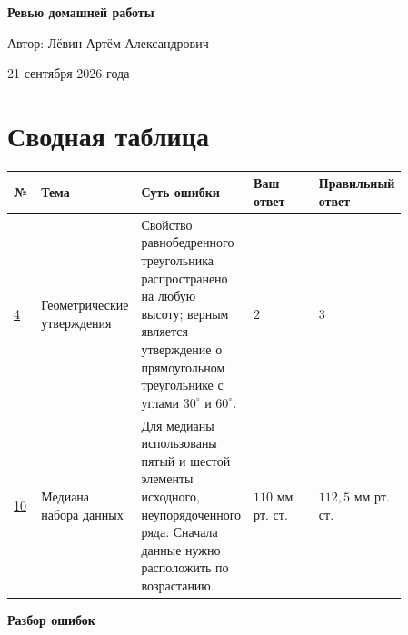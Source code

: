 \documentclass[12pt,a4paper]{article}
\begin{document}
\hypersetup{pageanchor=false}

\begin{titlepage}
\thispagestyle{empty}
\begin{center}
\vspace*{0.22\textheight}
{\LARGE\bfseries Ревью домашней работы\par}
\vspace{2.2cm}
{\large Автор: Лёвин Артём Александрович\par}
\vspace{0.7cm}
{\large 21 сентября 2026 года\par}
\vfill
{}
\end{center}
\end{titlepage}
\hypersetup{pageanchor=true}

\newpage
\section*{Сводная таблица}
\begin{center}
\small
\begin{tabular}{>{\centering\arraybackslash}p{0.07\linewidth} p{0.19\linewidth} p{0.25\linewidth} p{0.17\linewidth} p{0.18\linewidth}}
\toprule
\textbf{№} & \textbf{Тема} & \textbf{Суть ошибки} & \textbf{Ваш ответ} & \textbf{Правильный ответ} \\
\midrule
\hyperref[task:4]{4} & Геометрические утверждения & Свойство равнобедренного треугольника распространено на любую высоту; верным является утверждение о прямоугольном треугольнике с углами $30^\circ$ и $60^\circ$. & 2 & 3 \\
\addlinespace
\hyperref[task:10]{10} & Медиана набора данных & Для медианы использованы пятый и шестой элементы исходного, неупорядоченного ряда. Сначала данные нужно расположить по возрастанию. & $110$ мм рт. ст. & $112{,}5$ мм рт. ст. \\
\bottomrule
\end{tabular}
\end{center}

\newpage
\thispagestyle{empty}
\vspace*{0.35\textheight}
\begin{center}
{\LARGE\bfseries Разбор ошибок}
\end{center}
\newpage
\end{document}
